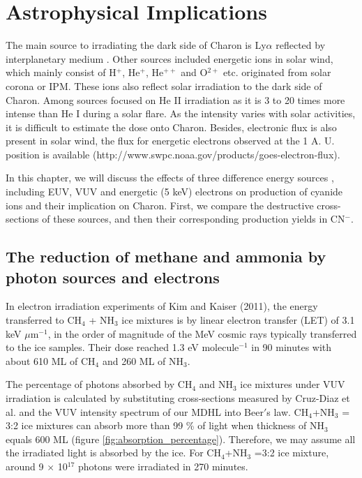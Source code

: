 \chapter{\protect Astrophysical Implications}
\label{astron}

The main source to irradiating the dark side of Charon is Ly$\alpha$ reflected by interplanetary medium \cite{grundy2016formation}. Other sources included energetic ions in solar wind, which mainly consist of H$^+$, He$^+$, He$^{++}$ and O$^{2+}$ etc. originated from solar corona or IPM. These ions also reflect solar irradiation to the dark side of Charon. Among sources focused on He II irradiation as it is 3 to 20 times more intense than He I during a solar flare. As the intensity varies with solar activities, it is difficult to estimate the dose onto Charon. Besides, electronic flux is also present in solar wind, the flux for energetic electrons observed at the 1 A. U. position is available (http://www.swpc.noaa.gov/products/goes-electron-flux). 

In this chapter, we will discuss the effects of three difference energy sources , including EUV, VUV and energetic (5 keV) electrons on production of cyanide ions and their implication on Charon. First, we compare the destructive cross-sections of these sources, and then their corresponding production yields in CN$^-$. 
\section{The reduction of methane and ammonia by photon sources and electrons}

In electron irradiation experiments of Kim and Kaiser (2011)\cite{kim}, the energy transferred to CH$_4$ + NH$_3$ ice mixtures is by linear electron transfer (LET) of 3.1 keV $\mu$m$^{-1}$, in the order of magnitude of the MeV cosmic rays typically transferred to the ice samples. Their dose reached 1.3 eV molecule$^{-1}$ in 90 minutes with about 610 ML of CH$_4$ and 260 ML of NH$_3$. 

The percentage of photons absorbed by CH$_4$ and NH$_3$ ice mixtures under VUV irradiation is calculated by substituting cross-sections measured by Cruz-Diaz et al. \cite{cruz2014vacuum} and the VUV intensity spectrum of our MDHL into Beer$'$s law. CH$_4$+NH$_3$ = 3:2 ice mixtures can absorb more than 99 \% of light when thickness of NH$_3$ equals 600 ML (figure \ref{fig:absorption_percentage}). Therefore, we may assume all the irradiated light is absorbed by the ice. For CH$_4$+NH$_3$ =3:2 ice mixture, around 9 $\times$ 10$^{17}$ photons were irradiated in 270 minutes.

